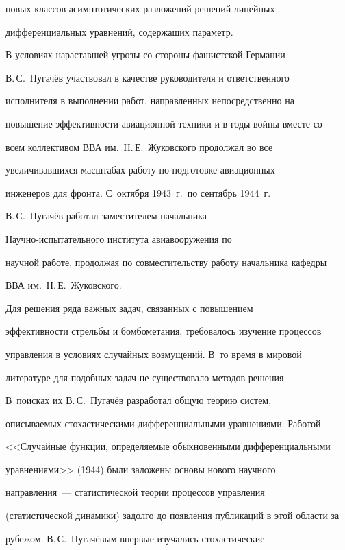 новых классов асимптотических разложений решений линейных 


дифференциальных уравнений, содержащих параметр. 


     


     В условиях нараставшей угрозы со стороны фашистской Германии 


В.\,С.~Пугачёв участвовал в качестве руководителя и ответственного 


исполнителя в выполнении работ, направленных непосредственно на 


повышение эффективности авиационной техники и в годы войны вместе со 


всем коллективом ВВА им.\ Н.\,Е.~Жуковского продолжал во все 


увеличивавшихся масштабах работу по подготовке авиационных 


инженеров для фронта. С~октября 1943~г.\ по сентябрь 1944~г.\ 


В.\,С.~Пугачёв работал заместителем начальника 


     На\-уч\-но-ис\-пы\-та\-тель\-но\-го института авиавооружения по 


научной работе, продолжая по совместительству работу начальника кафедры 


ВВА им.\ Н.\,Е.~Жуковского.


     


     Для решения ряда важных задач, связанных с повышением 


эффективности стрельбы и бомбометания, требовалось изучение процессов 


управления в условиях случайных возмущений. В~то время в мировой 


литературе для подобных задач не существовало методов решения. 


В~поисках их В.\,С.~Пугачёв разработал общую теорию систем, 


описываемых стохастическими дифференциальными уравнениями. Работой 


<<Случайные функции, определяемые обыкновенными дифференциальными 


уравнениями>> (1944) были заложены основы нового научного 


     направления~--- статистической теории процессов управления 


(статистической динамики) задолго до появления публикаций в этой области за 


рубежом. В.\,С.~Пугачёвым впервые изучались стохастические 


